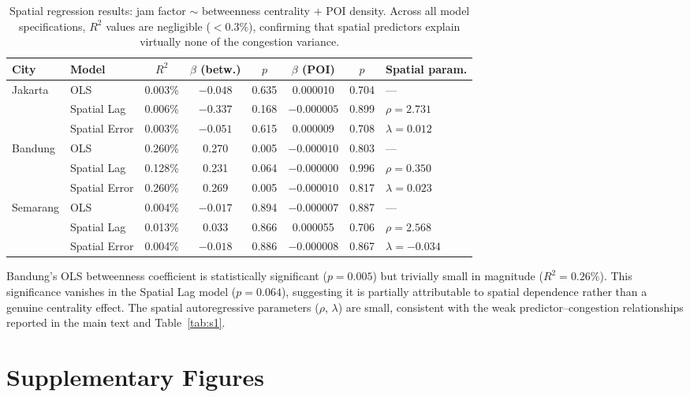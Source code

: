 \documentclass[preprint,12pt]{elsarticle}
\begin{document}
\begin{table}[!htbp]
\centering
\caption{Spatial regression results: jam factor $\sim$ betweenness centrality $+$ POI density. Across all model specifications, $R^2$ values are negligible ($<$0.3\%), confirming that spatial predictors explain virtually none of the congestion variance.}
\label{tab:s8}
\small
\begin{tabular}{llcccccl}
\toprule
City & Model & $R^2$ & $\beta$ (betw.) & $p$ & $\beta$ (POI) & $p$ & Spatial param. \\
\midrule
\multirow{3}{*}{Jakarta}
 & OLS           & 0.003\% & $-0.048$ & 0.635 & 0.000010  & 0.704 & ---              \\
 & Spatial Lag   & 0.006\% & $-0.337$ & 0.168 & $-0.000005$ & 0.899 & $\rho = 2.731$   \\
 & Spatial Error & 0.003\% & $-0.051$ & 0.615 & 0.000009  & 0.708 & $\lambda = 0.012$ \\
\midrule
\multirow{3}{*}{Bandung}
 & OLS           & 0.260\% & 0.270    & 0.005 & $-0.000010$ & 0.803 & ---              \\
 & Spatial Lag   & 0.128\% & 0.231    & 0.064 & $-0.000000$ & 0.996 & $\rho = 0.350$   \\
 & Spatial Error & 0.260\% & 0.269    & 0.005 & $-0.000010$ & 0.817 & $\lambda = 0.023$ \\
\midrule
\multirow{3}{*}{Semarang}
 & OLS           & 0.004\% & $-0.017$ & 0.894 & $-0.000007$ & 0.887 & ---              \\
 & Spatial Lag   & 0.013\% & 0.033    & 0.866 & 0.000055  & 0.706 & $\rho = 2.568$   \\
 & Spatial Error & 0.004\% & $-0.018$ & 0.886 & $-0.000008$ & 0.867 & $\lambda = -0.034$ \\
\bottomrule
\end{tabular}
\end{table}

Bandung's OLS betweenness coefficient is statistically significant ($p{=}0.005$) but trivially small in magnitude ($R^2 = 0.26\%$). This significance vanishes in the Spatial Lag model ($p{=}0.064$), suggesting it is partially attributable to spatial dependence rather than a genuine centrality effect. The spatial autoregressive parameters ($\rho$, $\lambda$) are small, consistent with the weak predictor--congestion relationships reported in the main text and Table~\ref{tab:s1}.

\section{Supplementary Figures}
\label{sec:sfigs}
\end{document}
